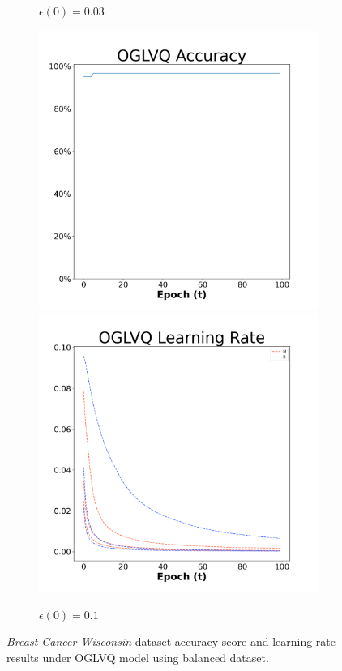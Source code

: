 \begin{figure}[H]
\begin{subfigure}{0.3\textwidth}
  \caption{$\epsilon(0)=0.03$}
\end{subfigure}\hfil %
\begin{subfigure}{0.3\textwidth}
  \includegraphics[width=\linewidth]{images/exper1/breast/OGLVQ_0.1_acc.png}
  \includegraphics[width=\linewidth]{images/exper1/breast/OGLVQ_0.1_lr.png}
  \caption{$\epsilon(0)=0.1$}
\end{subfigure}

\caption{\textit{Breast Cancer Wisconsin} dataset accuracy score and learning rate results under OGLVQ model using balanced dataset.}
\end{figure}





